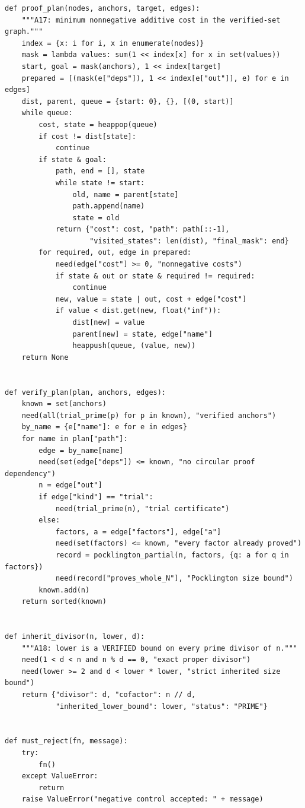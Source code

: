 \documentclass[11pt,a4paper]{article}
\theoremstyle{definition}\newtheorem{definition}[theorem]{Definition}
\theoremstyle{remark}\newtheorem{remark}[theorem]{Remark}
\begin{document}
\begin{lstlisting}[label=lst:certificates]
def proof_plan(nodes, anchors, target, edges):
    """A17: minimum nonnegative additive cost in the verified-set graph."""
    index = {x: i for i, x in enumerate(nodes)}
    mask = lambda values: sum(1 << index[x] for x in set(values))
    start, goal = mask(anchors), 1 << index[target]
    prepared = [(mask(e["deps"]), 1 << index[e["out"]], e) for e in edges]
    dist, parent, queue = {start: 0}, {}, [(0, start)]
    while queue:
        cost, state = heappop(queue)
        if cost != dist[state]:
            continue
        if state & goal:
            path, end = [], state
            while state != start:
                old, name = parent[state]
                path.append(name)
                state = old
            return {"cost": cost, "path": path[::-1],
                    "visited_states": len(dist), "final_mask": end}
        for required, out, edge in prepared:
            need(edge["cost"] >= 0, "nonnegative costs")
            if state & out or state & required != required:
                continue
            new, value = state | out, cost + edge["cost"]
            if value < dist.get(new, float("inf")):
                dist[new] = value
                parent[new] = state, edge["name"]
                heappush(queue, (value, new))
    return None


def verify_plan(plan, anchors, edges):
    known = set(anchors)
    need(all(trial_prime(p) for p in known), "verified anchors")
    by_name = {e["name"]: e for e in edges}
    for name in plan["path"]:
        edge = by_name[name]
        need(set(edge["deps"]) <= known, "no circular proof dependency")
        n = edge["out"]
        if edge["kind"] == "trial":
            need(trial_prime(n), "trial certificate")
        else:
            factors, a = edge["factors"], edge["a"]
            need(set(factors) <= known, "every factor already proved")
            record = pocklington_partial(n, factors, {q: a for q in factors})
            need(record["proves_whole_N"], "Pocklington size bound")
        known.add(n)
    return sorted(known)


def inherit_divisor(n, lower, d):
    """A18: lower is a VERIFIED bound on every prime divisor of n."""
    need(1 < d < n and n % d == 0, "exact proper divisor")
    need(lower >= 2 and d < lower * lower, "strict inherited size bound")
    return {"divisor": d, "cofactor": n // d,
            "inherited_lower_bound": lower, "status": "PRIME"}


def must_reject(fn, message):
    try:
        fn()
    except ValueError:
        return
    raise ValueError("negative control accepted: " + message)



\end{lstlisting}
\end{document}
